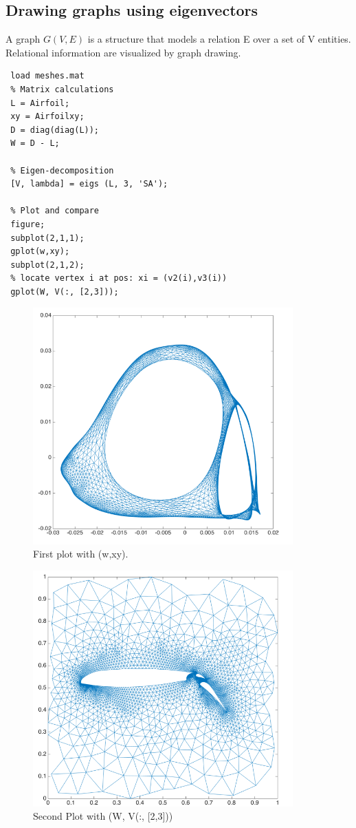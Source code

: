 \documentclass[unicode,11pt,a4paper,oneside,numbers=endperiod,openany]{scrartcl}
\begin{document}
\subsection{Drawing graphs using eigenvectors}
A graph $G(V,E)$ is a structure that models a relation E over a set of V entities. Relational information are visualized by graph drawing.
\begin{lstlisting}
 load meshes.mat
 % Matrix calculations
 L = Airfoil;
 xy = Airfoilxy;
 D = diag(diag(L));
 W = D - L;

 % Eigen-decomposition
 [V, lambda] = eigs (L, 3, 'SA');

 % Plot and compare
 figure;
 subplot(2,1,1);
 gplot(w,xy);
 subplot(2,1,2);
 % locate vertex i at pos: xi = (v2(i),v3(i))
 gplot(W, V(:, [2,3]));
\end{lstlisting}

\begin{figure}[H]
    \centering
    \includegraphics[trim=0cm 0cm 0cm 0cm, clip, width=10cm]{img1.png}
    \caption{First plot with (w,xy).}
    \label{fig:img2}
\end{figure}
\begin{figure}[H]
    \centering
    \includegraphics[trim=0cm 0cm 0cm 0cm, clip, width=10cm]{img2.png}
    \caption{Second Plot with (W, V(:, [2,3]))}
    \label{fig:img2}
\end{figure}
\end{document}
